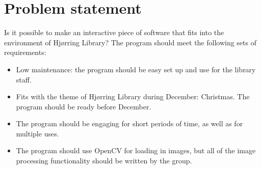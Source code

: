 \section{Problem statement}\label{problemStatement}
Is it possible to make an interactive piece of software that fits into the environment of Hjørring Library? The program should meet the following sets of requirements:

\begin{itemize}
\item Low maintenance: the program should be easy set up and use for the library staff.
\item Fits with the theme of Hjørring Library during December: Christmas. The program should be ready before December.
\item The program should be engaging for short periods of time, as well as for multiple uses.
\item The program should use OpenCV for loading in images, but all of the image processing functionality should be written by the group.
\end{itemize}